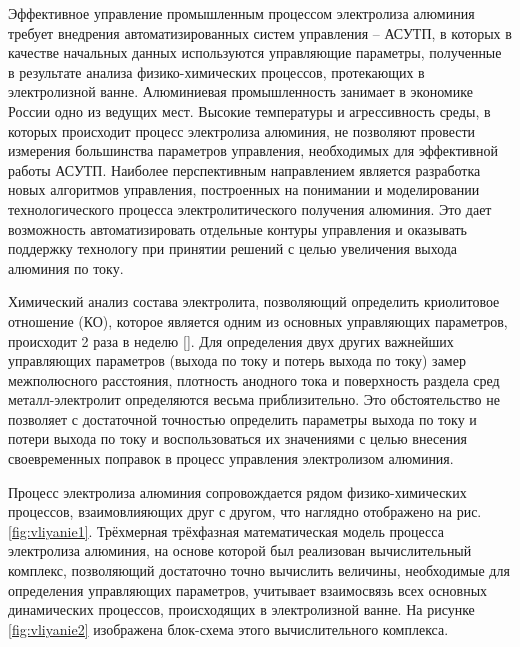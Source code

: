 \documentclass[pdflatex,sn-mathphys-gost]{pmi-jnl}
\begin{document}
Эффективное управление промышленным процессом электролиза алюминия требует внедрения автоматизированных систем управления – АСУТП, в которых в качестве начальных данных используются управляющие параметры, полученные в результате анализа физико-химических процессов, протекающих в электролизной ванне. Алюминиевая промышленность занимает в экономике России одно из ведущих мест. Высокие температуры и агрессивность среды, в которых происходит процесс электролиза алюминия, не позволяют провести измерения большинства параметров управления, необходимых для эффективной работы АСУТП. Наиболее перспективным направлением является разработка новых алгоритмов управления, построенных на понимании и моделировании технологического процесса электролитического получения алюминия. Это дает возможность автоматизировать отдельные контуры управления и оказывать поддержку технологу при принятии решений с целью увеличения выхода алюминия по току. 

Химический анализ состава электролита, позволяющий определить криолитовое отношение (КО), которое является одним из основных управляющих параметров, происходит 2 раза в неделю [\cite{litlink:belo}]. Для определения двух других важнейших управляющих параметров (выхода по току и потерь выхода по току) замер межполюсного расстояния, плотность анодного тока и поверхность раздела сред металл-электролит определяются весьма приблизительно. Это обстоятельство не позволяет с достаточной точностью определить параметры выхода по току и потери выхода по току и воспользоваться их значениями с целью внесения своевременных поправок в процесс управления электролизом алюминия.

Процесс электролиза алюминия сопровождается рядом физико-химических процессов, взаимовлияющих друг с другом, что наглядно отображено на рис. \ref{fig:vliyanie1}. Трёхмерная трёхфазная математическая модель процесса электролиза алюминия, на основе которой был реализован вычислительный комплекс, позволяющий достаточно точно вычислить величины, необходимые для определения управляющих параметров, учитывает взаимосвязь всех основных динамических процессов, происходящих в электролизной ванне. На рисунке \ref{fig:vliyanie2} изображена блок-схема этого вычислительного комплекса.
\end{document}
